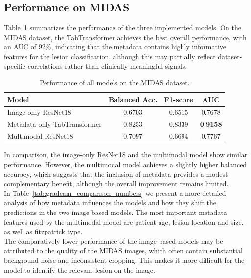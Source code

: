 \documentclass{article}
\begin{document}
	\subsection{Performance on MIDAS}
	
	Table~\ref{tab:midas_results} summarizes the performance of the three implemented models. On the MIDAS dataset, the TabTransformer achieves the best overall performance, with an AUC of $92\%$, indicating that the metadata contains highly informative features for the lesion classification, although this may partially reflect dataset-specific correlations rather than clinically meaningful signals.
	
	\begin{table}[h]
		\centering
		\caption{Performance of all models on the MIDAS dataset.}
		\label{tab:midas_results}
		\begin{tabular}{lccc}
			\hline
			\textbf{Model} & \textbf{Balanced Acc.} & \textbf{F1-score} & \textbf{AUC} \\
			\hline
			
			Image-only ResNet18 & 0.6703 & 0.6515 & 0.7678 \\
			Metadata-only TabTransformer & 0.8253 & 0.8339 & \textbf{0.9158} \\
			Multimodal ResNet18 & 0.7097 & 0.6694 & 0.7767 \\
			
			\hline
		\end{tabular}
	\end{table}
	
	In comparison, the image-only ResNet18 and the multimodal model show similar performance. %
	However, the multimodal model achieves a slightly higher balanced accuracy, which suggests that the inclusion of metadata provides a modest complementary benefit, although the overall improvement remains limited.\\
	In Table~\ref{tab:gradcam_comparison_numbers} we present a more detailed analysis of how metadata influences the models and how they shift the predictions in the two image based models. The most important metadata features used by the multimodal model are patient age, lesion location and size, as well as fitzpatrick type.\\
	The comparatively lower performance of the image-based models may be attributed to the quality of the MIDAS images, which often contain substantial background noise and inconsistent cropping. This makes it more difficult for the model to identify the relevant lesion on the image.
	
\end{document}
